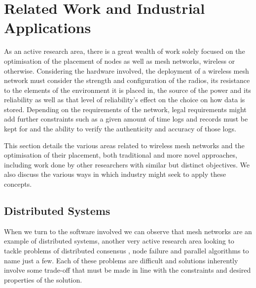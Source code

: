 \section{Related Work and Industrial Applications}
	\label{sec:related_work}
	As an active research area, there is a great wealth of work solely focused on the optimisation of the placement of nodes as well as mesh networks, wireless or otherwise. Considering the hardware involved, the deployment of a wireless mesh network must consider the strength and configuration of the radios, its resistance to the elements of the environment it is placed in, the source of the power and its reliability as well as that level of reliability's effect on the choice on how data is stored. Depending on the requirements of the network, legal requirements might add further constraints such as a given amount of time logs and records must be kept for and the ability to verify the authenticity and accuracy \cite{gdpr} of those logs.

	This section details the various areas related to wireless mesh networks and the optimisation of their placement, both traditional and more novel approaches, including work done by other researchers with similar but distinct objectives. We also discuss the various ways in which industry might seek to apply these concepts.

	\subsection{Distributed Systems}
		\label{sec:related_work_distributed} 
		When we turn to the software involved we can observe that mesh networks are an example of distributed systems, another very active research area looking to tackle problems of distributed consensus \cite{lamport2019byzantine} \cite{paxos} \cite{raft}, node failure and parallel algorithms to name just a few. Each of these problems are difficult and solutions inherently involve some trade-off that must be made in line with the constraints and desired properties of the solution.

